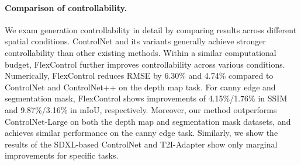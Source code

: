 \begin{table}
    \centering
    \caption{
        \textbf{Controllability comparison across different conditioning types.} 
        We report RMSE (↓) for Depth Map and SSIM (↑) for Canny Edge and mIoU (↑) for Seg. Mask.
        The best and second-best results are highlighted in \textcolor{red}{red} and \textcolor{blue}{blue}. FlexControl achieve similar but slightly better controllability than ControlNet-Large with only \textbf{half} activation blocks.
    }
    \label{tab:table2}
\end{table}

\paragraph{Comparison of controllability.}
We exam generation controllability in detail by comparing results across different spatial conditions. ControlNet and its variants generally achieve stronger controllability than other existing methods. Within a similar computational budget, FlexControl further improves controllability across various conditions.  Numerically, FlexControl reduces RMSE by 6.30\% and 4.74\% compared to ControlNet and ControlNet++ on the depth map task. For canny edge and segmentation mask, FlexControl shows improvements of 4.15\%/1.76\% in SSIM and 9.87\%/3.16\% in mIoU, respectively. Moreover, our method outperforms ControlNet-Large on both the depth map and segmentation mask datasets, and achieves similar performance on the canny edge task. Similarly, we show the results of the SDXL-based ControlNet and T2I-Adapter show only marginal improvements for specific tasks.


